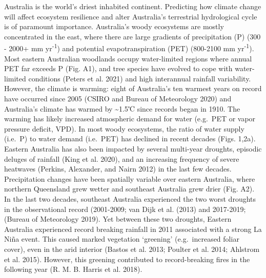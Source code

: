 \documentclass[
]{article}
\begin{document}
\introduction[Introduction]

Australia is the world's driest inhabited continent. Predicting how
climate change will affect ecosystem resilience and alter Australia's
terrestrial hydrological cycle is of paramount importance. Australia's
woody ecosystems are mostly concentrated in the east, where there are
large gradients of precipitation (P) (300 - 2000+ mm
yr\textsuperscript{-1}) and potential evapotranspiration (PET) (800-2100
mm yr\textsuperscript{-1}). Most eastern Australian woodlands occupy
water-limited regions where annual PET far exceeds P (Fig. A1), and tree
species have evolved to cope with water-limited conditions (Peters et
al. 2021) and high interannual rainfall variability. However, the
climate is warming: eight of Australia's ten warmest years on record
have occurred since 2005 (CSIRO and Bureau of Meteorology 2020) and
Australia's climate has warmed by \textasciitilde1.5℃ since records
began in 1910. The warming has likely increased atmospheric demand for
water (e.g.~PET or vapor pressure deficit, VPD). In most woody
ecosystems, the ratio of water supply (i.e.~P) to water demand
(i.e.~PET) has declined in recent decades (Figs. 1,2a). Eastern
Australia has also been impacted by several multi-year droughts,
episodic deluges of rainfall (King et al. 2020), and an increasing
frequency of severe heatwaves (Perkins, Alexander, and Nairn 2012) in
the last few decades. Precipitation changes have been spatially variable
over eastern Australia, where northern Queensland grew wetter and
southeast Australia grew drier (Fig. A2). In the last two decades,
southeast Australia experienced the two worst droughts in the
observational record (2001-2009; van Dijk et al. (2013) and 2017-2019;
(Bureau of Meteorology 2019). Yet between these two droughts, Eastern
Australia experienced record breaking rainfall in 2011 associated with a
strong La Niña event. This caused marked vegetation `greening'
(e.g.~increased foliar cover), even in the arid interior (Bastos et al.
2013; Poulter et al. 2014; Ahlstrom et al. 2015). However, this greening
contributed to record-breaking fires in the following year (R. M. B.
Harris et al. 2018).
\end{document}
